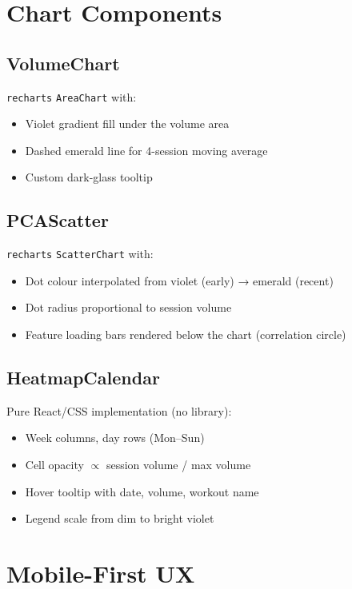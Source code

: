 \documentclass[12pt,a4paper]{report}
\begin{document}
\section{Chart Components}

\subsection{VolumeChart}

\texttt{recharts} \texttt{AreaChart} with:
\begin{itemize}
  \item Violet gradient fill under the volume area
  \item Dashed emerald line for 4-session moving average
  \item Custom dark-glass tooltip
\end{itemize}

\subsection{PCAScatter}

\texttt{recharts} \texttt{ScatterChart} with:
\begin{itemize}
  \item Dot colour interpolated from violet (early) → emerald (recent)
  \item Dot radius proportional to session volume
  \item Feature loading bars rendered below the chart (correlation circle)
\end{itemize}

\subsection{HeatmapCalendar}

Pure React/CSS implementation (no library):
\begin{itemize}
  \item Week columns, day rows (Mon--Sun)
  \item Cell opacity $\propto$ session volume / max volume
  \item Hover tooltip with date, volume, workout name
  \item Legend scale from dim to bright violet
\end{itemize}

\section{Mobile-First UX}
\end{document}
